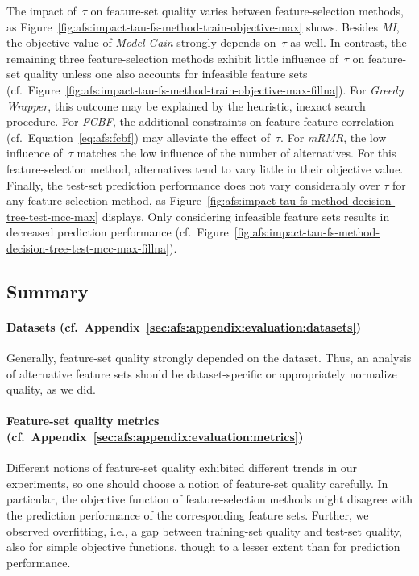 \documentclass{article}
\theoremstyle{definition}
\begin{document}
The impact of~$\tau$ on feature-set quality varies between feature-selection methods, as Figure~\ref{fig:afs:impact-tau-fs-method-train-objective-max} shows.
Besides \emph{MI}, the objective value of \emph{Model Gain} strongly depends on~$\tau$ as well.
In contrast, the remaining three feature-selection methods exhibit little influence of~$\tau$ on feature-set quality unless one also accounts for infeasible feature sets (cf.~Figure~\ref{fig:afs:impact-tau-fs-method-train-objective-max-fillna}).
For \emph{Greedy Wrapper}, this outcome may be explained by the heuristic, inexact search procedure.
For \emph{FCBF}, the additional constraints on feature-feature correlation (cf.~Equation~\ref{eq:afs:fcbf}) may alleviate the effect of~$\tau$.
For \emph{mRMR}, the low influence of~$\tau$ matches the low influence of the number of alternatives.
For this feature-selection method, alternatives tend to vary little in their objective value.
Finally, the test-set prediction performance does not vary considerably over $\tau$ for any feature-selection method, as Figure~\ref{fig:afs:impact-tau-fs-method-decision-tree-test-mcc-max} displays.
Only considering infeasible feature sets results in decreased prediction performance (cf.~Figure~\ref{fig:afs:impact-tau-fs-method-decision-tree-test-mcc-max-fillna}).

\subsection{Summary}
\label{sec:afs:evaluation:summary}

\paragraph{Datasets (cf.~Appendix~\ref{sec:afs:appendix:evaluation:datasets})}

Generally, feature-set quality strongly depended on the dataset.
Thus, an analysis of alternative feature sets should be dataset-specific or appropriately normalize quality, as we did.

\paragraph{Feature-set quality metrics (cf.~Appendix~\ref{sec:afs:appendix:evaluation:metrics})}

Different notions of feature-set quality exhibited different trends in our experiments, so one should choose a notion of feature-set quality carefully.
In particular, the objective function of feature-selection methods might disagree with the prediction performance of the corresponding feature sets.
Further, we observed overfitting, i.e., a gap between training-set quality and test-set quality, also for simple objective functions, though to a lesser extent than for prediction performance.
\end{document}
